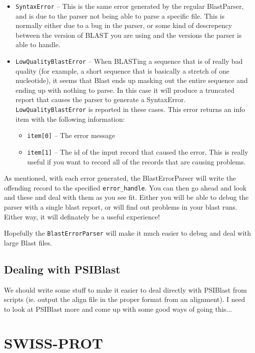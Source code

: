 \documentclass{report}
\begin{document}
\begin{itemize}
  \item \verb|SyntaxError| -- This is the same error generated by the regular BlastParser, and is due to the parser not being able to parse a specific file. This is normally either due to a bug in the parser, or some kind of descrepency between the version of BLAST you are using and the versions the parser is able to handle.

  \item \verb|LowQualityBlastError| -- When BLASTing a sequence that is of really bad quality (for example, a short sequence that is basically a stretch of one nucleotide), it seems that Blast ends up masking out the entire sequence and ending up with nothing to parse. In this case it will produce a truncated report that causes the parser to generate a SyntaxError. \verb|LowQualityBlastError| is reported in these cases. This error returns an info item with the following information:
  \begin{itemize}
    \item \verb|item[0]| -- The error message
    \item \verb|item[1]| -- The id of the input record that caused the error. This is really useful if you want to record all of the records that are causing problems.
  \end{itemize}
\end{itemize}

As mentioned, with each error generated, the BlastErrorParser will write the offending record to the specified \verb|error_handle|. You can then go ahead and look and these and deal with them as you see fit. Either you will be able to debug the parser with a single blast report, or will find out problems in your blast runs. Either way, it will definately be a useful experience!


Hopefully the \verb|BlastErrorParser| will make it much easier to debug and deal with large Blast files.

\subsection{Dealing with PSIBlast}

We should write some stuff to make it easier to deal directly with PSIBlast from scripts (ie. output the align file in the proper format from an alignment). I need to look at PSIBlast more and come up with some good ways of going this...

\section{SWISS-PROT}
\label{sec:swiss_prot}
\end{document}
